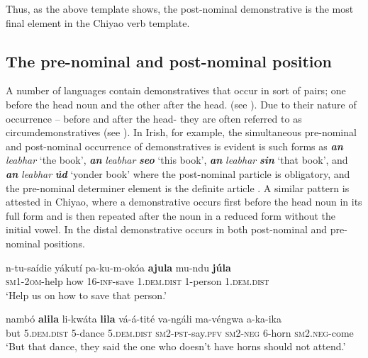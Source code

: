 \documentclass[output=paper,
            colorlinks, citecolor=brown
            ,draftmode
		  ]{langscibook}
\begin{document}
Thus, as the above template shows, the post-nominal demonstrative is the most final element in the Chiyao verb template.

\subsection{The pre-nominal and post-nominal position}\label{sec:taji:5.3}

A number of languages contain demonstratives that occur in sort of pairs; one before the head noun and the other after the head. (see \citealt{Lyons1999}). Due to their nature of occurrence -- before and after the head- they are often referred to as circumdemonstratives (see \citealt[6]{VandeVelde2005}). In Irish, for example, the simultaneous pre-nominal and post-nominal occurrence of demonstratives is evident is such forms as \textbf{\textit{an} }\textit{leabhar} ‘the book’, \textbf{\textit{an} }\textit{leabhar} \textbf{\textit{seo}} ‘this book’, \textbf{\textit{an} }\textit{leabhar} \textbf{\textit{sin}} ‘that book’, and \textbf{\textit{an} }\textit{leabhar} \textbf{\textit{úd}} ‘yonder book’ where the post-nominal particle is obligatory, and the pre-nominal determiner element is the definite article \citep[117]{Lyons1999}. A similar pattern is attested in Chiyao, where a demonstrative occurs first before the head noun in its full form and is then repeated after the noun in a reduced form without the initial vowel. In  the distal demonstrative occurs in both post-nominal and pre-nominal positions.

\ea%
    \label{ex:taji:27}
    \ea\label{ex:taji:27a} \gll n{}-tu{}-saídie            yákutí    pa{}-ku{}-m{}-okóa    \textbf{ajula}                    mu-ndu \textbf{júla}\\
      \textsc{sm1-2om}-help  how        16-\textsc{inf}-save      1.\textsc{dem.dist}    1-person  1.\textsc{dem.dist}\\
    \glt ‘Help us on how to save that person.’      

    \ex\label{ex:taji:27b} \gll nambó    \textbf{alila}                    li{}-kwáta    \textbf{lila}                        vá{}-á{}-tité       va{}-ngáli          ma{}-véngwa        a{}-ka{}-ika\\             
      but            5.\textsc{dem.dist}      5-dance      5.\textsc{dem.dist}    \textsc{sm2-pst}-say.\textsc{pfv}  \textsc{sm2-neg}      6-horn                  \textsc{sm2.neg}-come\\    
    \glt ‘But that dance, they said the one who doesn’t have horns should not attend.’
    \z
\z
\end{document}
